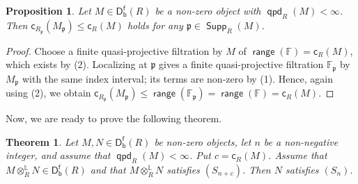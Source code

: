 \documentclass[10pt, a4paper,reqno]{amsart}
\newtheorem{thm}{Theorem}[section]
\newtheorem{prop}[prop]{Proposition}
\theoremstyle{definition}
\theoremstyle{remark}
\numberwithin{equation}{thm}
\def\FF{\mathbb{F}}
\def\fp{\mathfrak{p}}
\def\c{\mathsf{c}}
\def\Supp{\operatorname{\mathsf{Supp}}}
\def\Dfb{\mathsf{D^f_b}}
\def\ltensor{\otimes^{\mathbb{L}}}
\def\range{\operatorname{\mathsf{range}}}
\def\qpd{\operatorname{\mathsf{qpd}}}
\begin{document}
\begin{prop}\label{qcx}
Let $M\in\Dfb(R)$ be a non-zero object with $\qpd_R(M) < \infty$.
Then $\c_{R_\fp}(M_\fp) \le \c_R(M)$ holds for any $\fp \in \Supp_R(M)$.
\end{prop}

\begin{proof}
Choose a finite quasi-projective filtration by $M$ of $\range(\FF) = \c_R(M)$, which exists by (2).
Localizing at $\fp$ gives a finite quasi-projective filtration $\FF_\fp$ by $M_\fp$ with the same index interval; its terms are non-zero by (1). 
Hence, again using (2), we obtain $\c_{R_\fp}(M_\fp) \le \range(\FF_\fp) = \range(\FF) = \c_{R}(M)$.
\end{proof}

Now, we are ready to prove the following theorem.

\begin{thm}\label{Serre}
Let $M,N\in\Dfb(R)$ be non-zero objects, let $n$ be a non-negative integer, and assume that $\qpd_R(M)<\infty$. 
Put $c=\c_R(M)$.
Assume that $M \ltensor_R N \in \Dfb(R)$ and that $M \ltensor_R N$ satisfies $(S_{n+c})$.	
Then $N$ satisfies $(S_n)$.
\end{thm}
\end{document}
